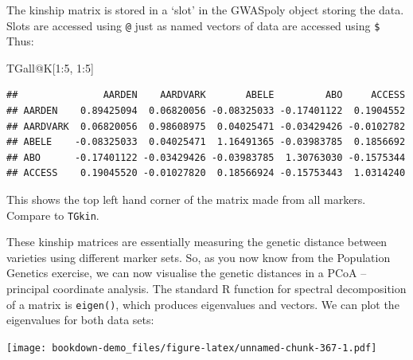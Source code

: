 \documentclass[
]{book}
\newenvironment{Shaded}{\begin{snugshade}}{\end{snugshade}}
\newcommand{\DecValTok}[1]{\textcolor[rgb]{0.00,0.00,0.81}{#1}}
\newcommand{\FunctionTok}[1]{\textcolor[rgb]{0.00,0.00,0.00}{#1}}
\newcommand{\NormalTok}[1]{#1}
\newcommand{\SpecialCharTok}[1]{\textcolor[rgb]{0.00,0.00,0.00}{#1}}
\begin{document}
The kinship matrix is stored in a `slot' in the GWASpoly object storing the data. Slots are accessed using \texttt{@} just as named vectors of data are accessed using \texttt{\$} Thus:

\begin{Shaded}
\begin{Highlighting}[]
\NormalTok{TGall}\SpecialCharTok{@}\NormalTok{K[}\DecValTok{1}\SpecialCharTok{:}\DecValTok{5}\NormalTok{, }\DecValTok{1}\SpecialCharTok{:}\DecValTok{5}\NormalTok{]}
\end{Highlighting}
\end{Shaded}

\begin{verbatim}
##               AARDEN    AARDVARK       ABELE         ABO     ACCESS
## AARDEN    0.89425094  0.06820056 -0.08325033 -0.17401122  0.1904552
## AARDVARK  0.06820056  0.98608975  0.04025471 -0.03429426 -0.0102782
## ABELE    -0.08325033  0.04025471  1.16491365 -0.03983785  0.1856692
## ABO      -0.17401122 -0.03429426 -0.03983785  1.30763030 -0.1575344
## ACCESS    0.19045520 -0.01027820  0.18566924 -0.15753443  1.0314240
\end{verbatim}

This shows the top left hand corner of the matrix made from all markers. Compare to \texttt{TGkin}.

These kinship matrices are essentially measuring the genetic distance between varieties using different marker sets. So, as you now know from the Population Genetics exercise, we can now visualise the genetic distances in a PCoA -- principal coordinate analysis. The standard R function for spectral decomposition of a matrix is \texttt{eigen()}, which produces eigenvalues and vectors. We can plot the eigenvalues for both data sets:

\begin{Shaded}
\end{Shaded}

\texttt{[image: bookdown-demo\_files/figure-latex/unnamed-chunk-367-1.pdf]}

\begin{Shaded}
\end{Shaded}
\end{document}

